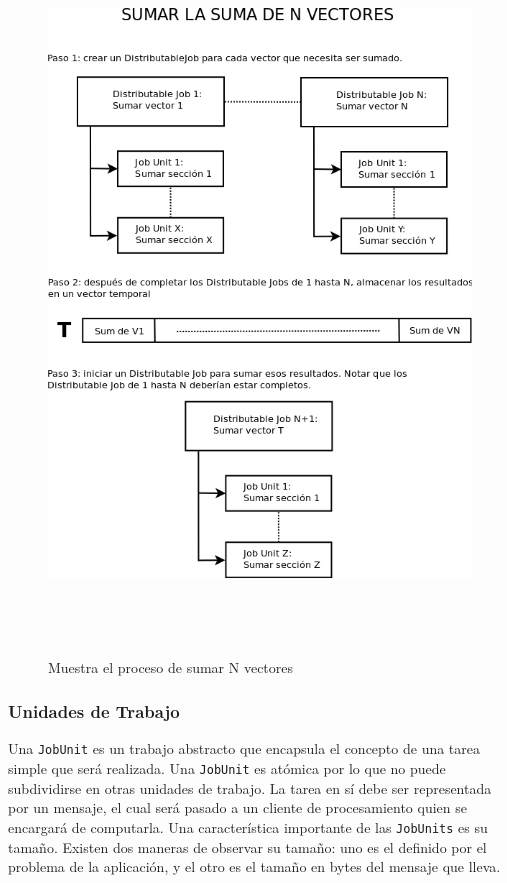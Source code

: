 \begin{figure}[H]
\begin{center}
  \includegraphics[height=7.5in,width=5.0in]{images/FuD-fig2.png}
\caption{Muestra el proceso de sumar N vectores}
\label{fig:example}
\end{center}
\end{figure} 


\subsubsection{Unidades de Trabajo}

Una \texttt{JobUnit} es un trabajo abstracto que encapsula el concepto de una tarea simple que será realizada. 
Una \texttt{JobUnit} es atómica por lo que no puede subdividirse en otras unidades de trabajo. La tarea en sí debe ser representada por un mensaje,
 el cual será pasado a un cliente de procesamiento quien se encargará de computarla.
Una característica importante de las \texttt{JobUnits} es su tamaño. Existen dos maneras de observar su tamaño: uno es el definido por el problema de la aplicación,
y el otro es el tamaño en bytes del mensaje que lleva.

